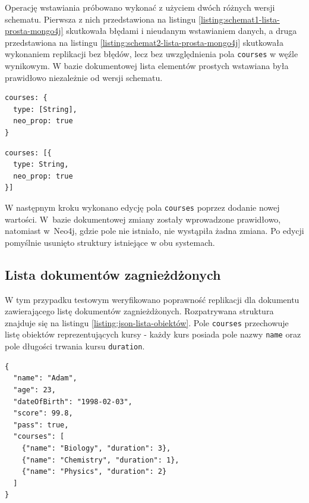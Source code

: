 \documentclass[a4paper,twoside,12pt]{book}
\begin{document}
Operację wstawiania próbowano wykonać z użyciem dwóch różnych wersji schematu. Pierwsza z nich przedstawiona na listingu \ref{listing:schemat1-lista-prosta-mongo4j} skutkowała błędami i nieudanym wstawianiem danych, a druga przedstawiona na listingu \ref{listing:schemat2-lista-prosta-mongo4j} skutkowała wykonaniem replikacji bez błędów, lecz bez uwzględnienia pola \texttt{courses} w węźle wynikowym. W bazie dokumentowej lista elementów prostych wstawiana była prawidłowo niezależnie od wersji schematu.

\begin{lstlisting}[style=JSON, caption={Fragment pierwszej wersji schematu dla pola kursów.}, label={listing:schemat1-lista-prosta-mongo4j}, captionpos=b]
courses: {
  type: [String],
  neo_prop: true
}
\end{lstlisting}

\begin{lstlisting}[style=JSON, caption={Fragment drugiej wersji schematu dla pola kursów.}, label={listing:schemat2-lista-prosta-mongo4j}, captionpos=b]
courses: [{
  type: String,
  neo_prop: true
}]
\end{lstlisting}

W następnym kroku wykonano edycję pola \texttt{courses} poprzez dodanie nowej wartości. W~bazie dokumentowej zmiany zostały wprowadzone prawidłowo, natomiast w~Neo4j, gdzie pole nie istniało, nie wystąpiła żadna zmiana. Po edycji pomyślnie usunięto struktury istniejące w obu systemach.

\subsection{Lista dokumentów zagnieżdżonych}

W tym przypadku testowym weryfikowano poprawność replikacji dla dokumentu zawierającego listę dokumentów zagnieżdżonych. Rozpatrywana struktura znajduje się na listingu \ref{listing:json-lista-obiektów}. Pole \texttt{courses} przechowuje listę obiektów reprezentujących kursy - każdy kurs posiada pole nazwy \texttt{name} oraz pole długości trwania kursu \texttt{duration}.

\begin{lstlisting}[style=JSON2, caption={Struktura dokumentu z listą dokumentów zagnieżdżonych.}, label={listing:json-lista-obiektów}, captionpos=b]
{
  "name": "Adam",
  "age": 23,
  "dateOfBirth": "1998-02-03",
  "score": 99.8,	
  "pass": true,
  "courses": [
    {"name": "Biology", "duration": 3},
    {"name": "Chemistry", "duration": 1},
    {"name": "Physics", "duration": 2}
  ]
}
\end{lstlisting}
\end{document}
